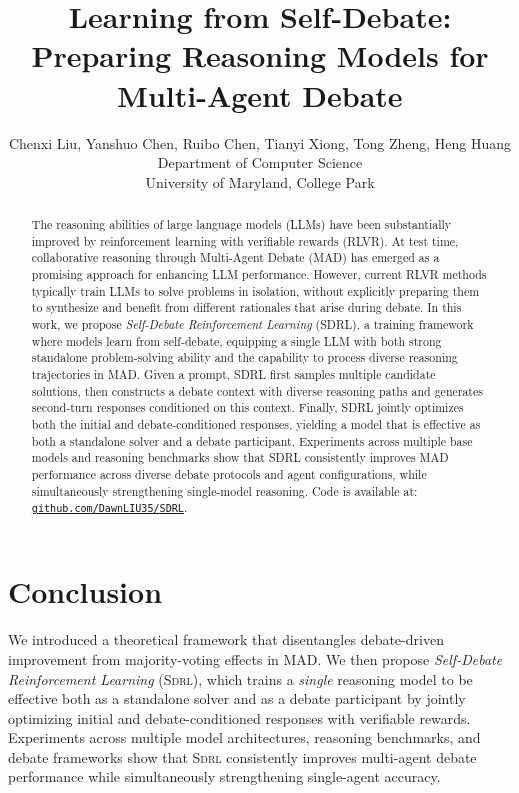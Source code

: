 \documentclass{article}
\title{Learning from Self-Debate: Preparing Reasoning Models for Multi-Agent Debate}
\author{%
  Chenxi Liu, Yanshuo Chen, Ruibo Chen, Tianyi Xiong, Tong Zheng, Heng Huang \\
  Department of Computer Science\\
  University of Maryland, College Park\\
}
\theoremstyle{plain}
\theoremstyle{definition}
\theoremstyle{remark}
\newcommand{\SDRL}{\textsc{Sdrl}}
\begin{document}
\maketitle


\begin{abstract}
The reasoning abilities of large language models (LLMs) have been substantially improved by reinforcement learning with verifiable rewards (RLVR). At test time, collaborative reasoning through Multi-Agent Debate (MAD) has emerged as a promising approach for enhancing LLM performance. However, current RLVR methods typically train LLMs to solve problems in isolation, without explicitly preparing them to synthesize and benefit from different rationales that arise during debate. In this work, we propose \emph{Self-Debate Reinforcement Learning} (SDRL), a training framework where models learn from self-debate, equipping a single LLM with both strong standalone problem-solving ability and the capability to process diverse reasoning trajectories in MAD. Given a prompt, SDRL first samples multiple candidate solutions, then constructs a debate context with diverse reasoning paths and generates second-turn responses conditioned on this context. Finally, SDRL jointly optimizes both the initial and debate-conditioned responses, yielding a model that is effective as both a standalone solver and a debate participant. Experiments across multiple base models and reasoning benchmarks show that SDRL consistently improves MAD performance across diverse debate protocols and agent configurations, while simultaneously strengthening single-model reasoning. Code is available at: \href{https://github.com/DawnLIU35/SDRL}{\texttt{github.com/DawnLIU35/SDRL}}.
\end{abstract}


% 





\section{Conclusion}

We introduced a theoretical framework that disentangles debate-driven improvement from majority-voting effects in MAD. We then propose \emph{Self-Debate Reinforcement Learning} (\SDRL{}), which trains a \emph{single} reasoning model to be effective both as a standalone solver and as a debate participant by jointly optimizing initial and debate-conditioned responses with verifiable rewards. Experiments across multiple model architectures, reasoning benchmarks, and debate frameworks show that \SDRL{} consistently improves multi-agent debate performance while simultaneously strengthening single-agent accuracy.




\appendix

\end{document}

